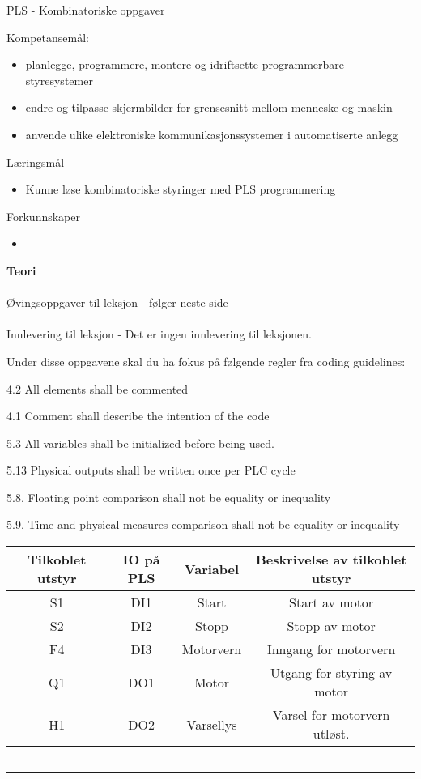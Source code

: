 \centerline{PLS - Kombinatoriske oppgaver}  \bigskip

Kompetansemål:
\begin{itemize}[noitemsep]

	\item planlegge, programmere, montere og idriftsette programmerbare styresystemer
	\item endre og tilpasse skjermbilder for grensesnitt mellom menneske og maskin
	\item anvende ulike elektroniske kommunikasjonssystemer i automatiserte anlegg
\end{itemize}
	Læringsmål
	\begin{itemize}[noitemsep]
		\item Kunne løse kombinatoriske styringer med PLS programmering
	\end{itemize}

	Forkunnskaper

	\begin{itemize}[noitemsep]
		\item 

	\end{itemize}
\textbf{Teori}\\\\
Øvingsoppgaver til leksjon - følger neste side\\\\
Innlevering til leksjon - Det er ingen innlevering til leksjonen. 


Under disse oppgavene skal du ha fokus på følgende regler fra coding
guidelines:

4.2 All elements shall be commented

4.1 Comment shall describe the intention of the code

5.3 All variables shall be initialized before being used. 

5.13 Physical outputs shall be written once per PLC cycle

5.8. Floating point comparison shall not be equality or inequality

5.9. Time and physical measures comparison shall not be equality or
inequality

\begin{tabular}{|c|c|c|c|}
\hline 
Tilkoblet utstyr & IO på PLS & Variabel & Beskrivelse av tilkoblet utstyr\tabularnewline
\hline 
\hline 
S1 & DI1 & Start & Start av motor\tabularnewline
\hline 
S2 & DI2 & Stopp & Stopp av motor\tabularnewline
\hline 
F4 & DI3 & Motorvern & Inngang for motorvern\tabularnewline
\hline 
Q1 & DO1 & Motor & Utgang for styring av motor\tabularnewline
\hline 
H1 & DO2 & Varsellys & Varsel for motorvern utløst. \tabularnewline
\hline 
\end{tabular}
\bigskip 
\hrule
\vfil \eject

\bigskip 
 
\hrule

\vfil \eject


